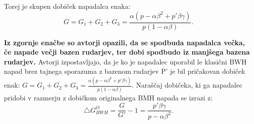 \documentclass[12pt]{article}
\begin{document}
Torej je skupen dobiček napadalca enaka:
\newline
\begin{equation} \label{eq:2}
G = G_1 + G_2 + G_3 = \frac{\alpha(p-\alpha\beta^2 + p'\beta\gamma)}{p(1 - \alpha\beta)}.
\end{equation}

\textbf{Iz zgornje enačbe so avtorji opazili, da se spodbuda napadalca večka, če napade večji bazen rudarjev, ter dobi spodbudo iz manjšega bazena rudarjev.}
\newline
Avtorji izpostavljajo, da je ko je napadalec uporabil le klasični BWH napad brez tajnega sporazuma z bazenom rudarjev P' je bil pričakovan dobiček enak: $ G = G_1 + G_2 + G_3 = \frac{\alpha(p-\alpha\beta^2 + p'\beta\gamma)}{p(1 - \alpha\beta)}. $ Naraščaj dobičeka, ki ga napadalec pridobi v razmerju z dobičkom originalnega BMH napada se izrazi z:
\newline
\begin{equation} \label{eq:3}
\bigtriangleup G_{BWH}^O = \frac{G}{G'} - 1 = \frac{p'\beta\gamma}{p - \alpha\beta^2}.
\end{equation}
\end{document}
